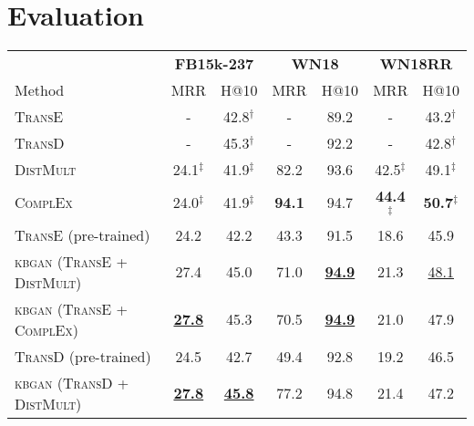 \chapter{Evaluation}
\label{ch:evaluation}


\begin{table*}[t]
\centering
\begin{tabular}{|l|cc|cc|cc|}
\hline
             & \multicolumn{2}{c}{\bf FB15k-237} \vline & \multicolumn{2}{c}{\bf WN18} \vline & \multicolumn{2}{c}{\bf WN18RR}\vline \\
Method                         & MRR         & H@10   & MRR         & H@10 & MRR & H@10\\
\hline
\textsc{TransE}    & - & 42.8$^{\dag}$ & - & 89.2 & -    & 43.2$^{\dag}$ \\
\textsc{TransD}    & - & 45.3$^{\dag}$ & - & 92.2 & -    & 42.8$^{\dag}$ \\ 
\textsc{DistMult}  & 24.1$^{\ddag}$  & 41.9$^{\ddag}$ & 82.2 & 93.6 & 42.5$^{\ddag}$ & 49.1$^{\ddag}$ \\
\textsc{ComplEx}   & 24.0$^{\ddag}$  & 41.9$^{\ddag}$ & \textbf{94.1} & 94.7 & \textbf{44.4}$^{\ddag}$ & \textbf{50.7}$^{\ddag}$ \\
\hline
\textsc{TransE} (pre-trained)                         & 24.2    & 42.2  & 43.3   & 91.5 & 18.6 & 45.9 \\
\textsc{kbgan} (\textsc{TransE} + \textsc{DistMult})  & 27.4  & 45.0 & 71.0 & \textbf{\underline{94.9}} & 21.3 & \underline{48.1} \\
\textsc{kbgan} (\textsc{TransE} + \textsc{ComplEx})   & \textbf{\underline{27.8}} & 45.3 & 70.5  & \textbf{\underline{94.9}} & 21.0 & 47.9 \\
\textsc{TransD} (pre-trained)                         & 24.5 & 42.7 & 49.4  & 92.8 & 19.2 & 46.5 \\
\textsc{kbgan} (\textsc{TransD} + \textsc{DistMult})  & \textbf{\underline{27.8}} & \textbf{\underline{45.8}} & 77.2 & 94.8 & 21.4 & 47.2\\

\end{tabular}
\end{table*}
